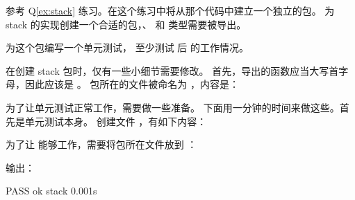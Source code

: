 \begin{Exercise}[title={stack 包},difficulty=2]
\label{ex:stack-package}
\Question\label{ex:stack-package q1} 
参考 Q\ref{ex:stack} 练习。在这个练习中将从那个代码中建立一个独立的包。
为 stack 的实现创建一个合适的包，、 和  类型需要被导出。

\Question\label{ex:stack-package q2} 为这个包编写一个单元测试，
至少测试  后  的工作情况。

\end{Exercise}

\begin{Answer}
\Question 在创建 stack 包时，仅有一些小细节需要修改。
首先，导出的函数应当大写首字母，因此应该是 。
包所在的文件被命名为 ，内容是：


\Question 为了让单元测试正常工作，需要做一些准备。
下面用一分钟的时间来做这些。首先是单元测试本身。
创建文件 ，有如下内容：

为了让  能够工作，需要将包所在文件放到 
：\\

\begin{display}
\pr {}
\pr {}
\pr {}
\end{display}

输出：\\

\begin{display}
\pr {}
PASS
ok      stack   0.001s
\end{display}
\end{Answer}
